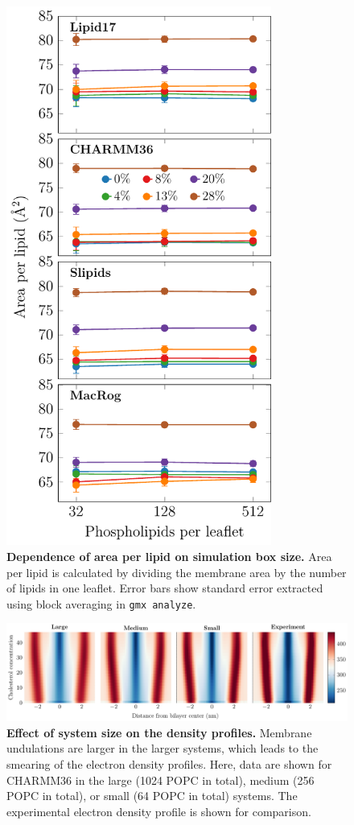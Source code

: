 \documentclass[journal=jpcbfk]{achemso}
\begin{document}
\begin{figure}[htb!]
    \centering
    \includegraphics[width=8.7cm]{../FIGS/apl_vs_size.pdf}
    \caption{\label{SIfig:aplvssize}%
     \textbf{Dependence of area per lipid on simulation box size.} Area per lipid is calculated by dividing the membrane area by the number of lipids in one leaflet. Error bars show standard error extracted using block averaging in \texttt{gmx analyze}.
    }
\end{figure}

\begin{figure}[htb!]
    \centering
    \includegraphics[width=\linewidth]{../FIGS/densityprofiles_size.pdf}
    \caption{\label{SIfig:densprofssize}%
    \textbf{Effect of system size on the density profiles.}
    Membrane undulations are larger in the larger systems, which leads to the smearing of the electron density profiles. Here, data are shown for CHARMM36 in the large (1024 POPC in total), medium (256 POPC in total), or small (64 POPC in total) systems. The experimental electron density profile is shown for comparison.
    }
\end{figure}
\end{document}
